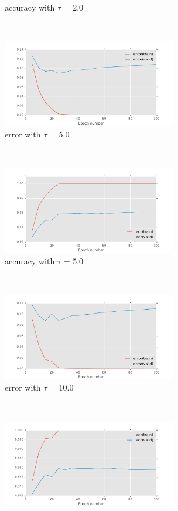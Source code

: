 \documentclass[11pt]{article}
\begin{document}
\begin{figure}[t!]
\begin{subfigure}[t]{0.45\textwidth}
        \caption{accuracy with $\tau$ = 2.0}
    \end{subfigure}   
    ~
    \begin{subfigure}[t]{0.45\textwidth}
        \centering
        \includegraphics[height=1.5in]{error_with_tau_5_0.pdf}
        \caption{error with $\tau$ = 5.0}
    \end{subfigure}   
    ~
    \begin{subfigure}[t]{0.45\textwidth}
        \centering
        \includegraphics[height=1.5in]{acc_with_tau_5_0.pdf}
        \caption{accuracy with $\tau$ = 5.0}
    \end{subfigure}  
    ~ 
    \begin{subfigure}[t]{0.45\textwidth}
        \centering
        \includegraphics[height=1.5in]{error_with_tau_10_0.pdf}
        \caption{error with $\tau$ = 10.0}
    \end{subfigure}   
    ~
    \begin{subfigure}[t]{0.45\textwidth}
        \centering
        \includegraphics[height=1.5in]{acc_with_tau_10_0.pdf}

\end{subfigure}
\end{figure}
\end{document}
